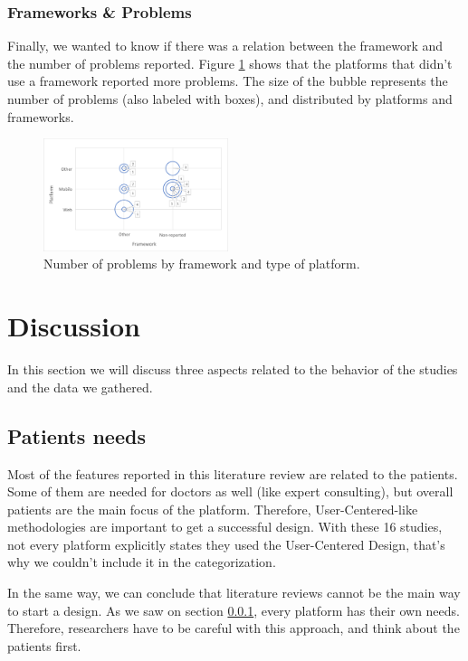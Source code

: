 \documentclass[conference]{IEEEtran}
\begin{document}
\subsubsection{Frameworks \& Problems}
\label{subsubsection:problems}

Finally, we wanted to know if there was a relation between the framework and the number of problems reported. Figure \ref{fig:problems_by_framework} shows that the platforms that didn't use a framework reported more problems. The size of the bubble represents the number of problems (also labeled with boxes), and distributed by platforms and frameworks.

\begin{figure}[h]
    \centering
    \includegraphics[width=0.48\textwidth]{charts/problems_by_framework.png}
    \caption{Number of problems by framework and type of platform.}
    \label{fig:problems_by_framework}
\end{figure}

\section{Discussion}

In this section we will discuss three aspects related to the behavior of the studies and the data we gathered.

\subsection{Patients needs}

Most of the features reported in this literature review are related to the patients. Some of them are needed for doctors as well (like expert consulting), but overall patients are the main focus of the platform. Therefore, User-Centered-like methodologies are important to get a successful design. With these 16 studies, not every platform explicitly states they used the User-Centered Design, that's why we couldn't include it in the categorization.

In the same way, we can conclude that literature reviews cannot be the main way to start a design. As we saw on section \ref{subsubsection:problems}, every platform has their own needs. Therefore, researchers have to be careful with this approach, and think about the patients first.
\end{document}
